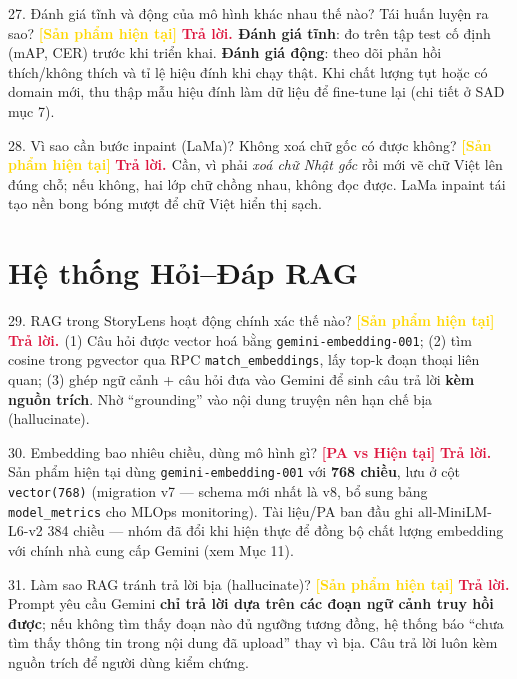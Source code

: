 \documentclass[11pt]{article}
\newcommand{\tagSP}{\textcolor{gold}{\footnotesize\textbf{[Sản phẩm hiện tại]}}}
\newcommand{\tagBoth}{\textcolor{crimson}{\footnotesize\textbf{[PA vs Hiện tại]}}}
\newcommand{\A}{\textbf{\textcolor{crimson}{Trả lời. }}}
\begin{document}
\begin{qa}{27. Đánh giá tĩnh và động của mô hình khác nhau thế nào? Tái huấn luyện ra sao? \tagSP}
\A \textbf{Đánh giá tĩnh}: đo trên tập test cố định (mAP, CER) trước khi triển khai. \textbf{Đánh giá động}: theo dõi phản hồi thích/không thích và tỉ lệ hiệu đính khi chạy thật. Khi chất lượng tụt hoặc có domain mới, thu thập mẫu hiệu đính làm dữ liệu để fine-tune lại (chi tiết ở SAD mục 7).
\end{qa}

\begin{qa}{28. Vì sao cần bước inpaint (LaMa)? Không xoá chữ gốc có được không? \tagSP}
\A Cần, vì phải \textit{xoá chữ Nhật gốc} rồi mới vẽ chữ Việt lên đúng chỗ; nếu không, hai lớp chữ chồng nhau, không đọc được. LaMa inpaint tái tạo nền bong bóng mượt để chữ Việt hiển thị sạch.
\end{qa}

\section{Hệ thống Hỏi--Đáp RAG}

\begin{qa}{29. RAG trong StoryLens hoạt động chính xác thế nào? \tagSP}
\A (1) Câu hỏi được vector hoá bằng \texttt{gemini-embedding-001}; (2) tìm cosine trong pgvector qua RPC \texttt{match\_embeddings}, lấy top-k đoạn thoại liên quan; (3) ghép ngữ cảnh + câu hỏi đưa vào Gemini để sinh câu trả lời \textbf{kèm nguồn trích}. Nhờ ``grounding'' vào nội dung truyện nên hạn chế bịa (hallucinate).
\end{qa}

\begin{qa}{30. Embedding bao nhiêu chiều, dùng mô hình gì? \tagBoth}
\A Sản phẩm hiện tại dùng \texttt{gemini-embedding-001} với \textbf{768 chiều}, lưu ở cột \texttt{vector(768)} (migration v7 --- schema mới nhất là v8, bổ sung bảng \texttt{model\_metrics} cho MLOps monitoring). Tài liệu/PA ban đầu ghi all-MiniLM-L6-v2 384 chiều --- nhóm đã đổi khi hiện thực để đồng bộ chất lượng embedding với chính nhà cung cấp Gemini (xem Mục 11).
\end{qa}

\begin{qa}{31. Làm sao RAG tránh trả lời bịa (hallucinate)? \tagSP}
\A Prompt yêu cầu Gemini \textbf{chỉ trả lời dựa trên các đoạn ngữ cảnh truy hồi được}; nếu không tìm thấy đoạn nào đủ ngưỡng tương đồng, hệ thống báo ``chưa tìm thấy thông tin trong nội dung đã upload'' thay vì bịa. Câu trả lời luôn kèm nguồn trích để người dùng kiểm chứng.
\end{qa}
\end{document}
